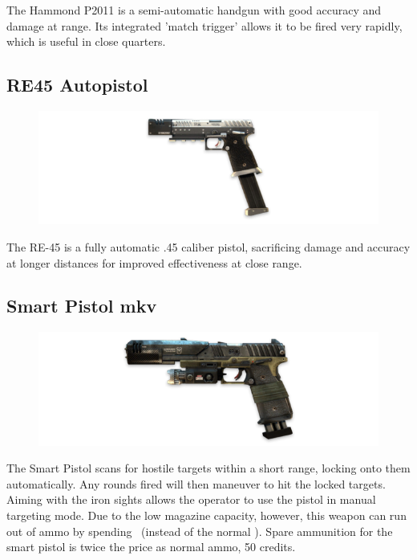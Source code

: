 \documentclass[9pt, openany]{extbook}
\begin{document}
The Hammond P2011 is a semi-automatic handgun with good accuracy and damage at range. Its integrated 'match trigger' allows it to be fired very rapidly, which is useful in close quarters. 

\subsection{RE45 Autopistol}

\begin{figure}
\vspace*{-2em}
\includegraphics[width=\linewidth]{RE45Autopistol}
\end{figure}


The RE-45 is a fully automatic .45 caliber pistol, sacrificing damage and accuracy at longer distances for improved effectiveness at close range.

\subsection{Smart Pistol mkv}

\begin{figure}
\vspace*{-2em}
\includegraphics[width=\linewidth]{SmartPistolMK5}
\end{figure}

The Smart Pistol scans for hostile targets within a short range, locking onto them automatically. Any rounds fired will then maneuver to hit the locked targets. Aiming with the iron sights allows the operator to use the pistol in manual targeting mode. Due to the low magazine capacity, however, this weapon can run out of ammo by spending \Threat\Threat\Threat\ (instead of the normal \Despair). Spare ammunition for the smart pistol is twice the price as normal ammo, 50 credits.
\end{document}
